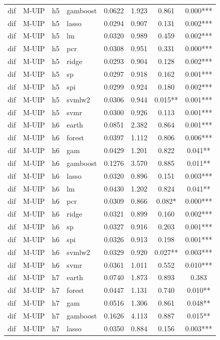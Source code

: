 \begin{ThreePartTable}
\begin{longtable}[t]{llclcccc}
dif & M-UIP & h5 & gamboost & 0.0622 & 1.923 & 0.861 & 0.000***\\
dif & M-UIP & h5 & lasso & 0.0294 & 0.907 & 0.131 & 0.002***\\
dif & M-UIP & h5 & lm & 0.0320 & 0.989 & 0.459 & 0.002***\\
dif & M-UIP & h5 & pcr & 0.0308 & 0.951 & 0.331 & 0.000***\\
dif & M-UIP & h5 & ridge & 0.0293 & 0.904 & 0.128 & 0.002***\\
dif & M-UIP & h5 & sp & 0.0297 & 0.918 & 0.162 & 0.001***\\
dif & M-UIP & h5 & spi & 0.0299 & 0.924 & 0.180 & 0.002***\\
dif & M-UIP & h5 & svmlw2 & 0.0306 & 0.944 & 0.015** & 0.001***\\
dif & M-UIP & h5 & svmr & 0.0300 & 0.926 & 0.113 & 0.001***\\
\addlinespace
dif & M-UIP & h6 & earth & 0.0851 & 2.382 & 0.864 & 0.001***\\
dif & M-UIP & h6 & forest & 0.0397 & 1.112 & 0.806 & 0.006***\\
dif & M-UIP & h6 & gam & 0.0429 & 1.201 & 0.822 & 0.041**\\
dif & M-UIP & h6 & gamboost & 0.1276 & 3.570 & 0.885 & 0.011**\\
dif & M-UIP & h6 & lasso & 0.0320 & 0.896 & 0.151 & 0.003***\\
dif & M-UIP & h6 & lm & 0.0430 & 1.202 & 0.824 & 0.041**\\
dif & M-UIP & h6 & pcr & 0.0309 & 0.866 & 0.082* & 0.000***\\
dif & M-UIP & h6 & ridge & 0.0321 & 0.899 & 0.160 & 0.002***\\
dif & M-UIP & h6 & sp & 0.0327 & 0.916 & 0.203 & 0.001***\\
dif & M-UIP & h6 & spi & 0.0326 & 0.913 & 0.198 & 0.001***\\
dif & M-UIP & h6 & svmlw2 & 0.0329 & 0.920 & 0.027** & 0.003***\\
dif & M-UIP & h6 & svmr & 0.0361 & 1.011 & 0.552 & 0.010***\\
\addlinespace
dif & M-UIP & h7 & earth & 0.0740 & 1.873 & 0.893 & 0.383\\
dif & M-UIP & h7 & forest & 0.0447 & 1.131 & 0.740 & 0.010**\\
dif & M-UIP & h7 & gam & 0.0516 & 1.306 & 0.861 & 0.048**\\
dif & M-UIP & h7 & gamboost & 0.1626 & 4.113 & 0.887 & 0.015**\\
dif & M-UIP & h7 & lasso & 0.0350 & 0.884 & 0.156 & 0.003***\\

\end{longtable}
\end{ThreePartTable}
